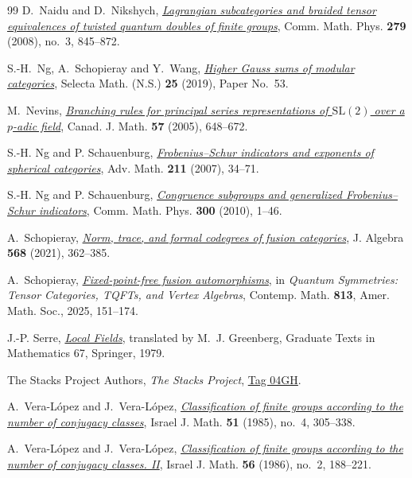 \documentclass[11pt]{amsart}
\numberwithin{equation}{section}
\theoremstyle{definition}
\theoremstyle{plain}
\begin{document}
\begin{thebibliography}{99}
D.~Naidu and D.~Nikshych,
\href{https://doi.org/10.1007/s00220-008-0441-5}{\emph{Lagrangian
subcategories and braided tensor equivalences of twisted quantum doubles
of finite groups}}, Comm. Math. Phys. \textbf{279} (2008), no.~3, 845--872.

S.-H.~Ng, A.~Schopieray and Y.~Wang,
\href{https://doi.org/10.1007/s00029-019-0499-2}{\emph{Higher Gauss sums of modular categories}},
Selecta Math. (N.S.) \textbf{25} (2019), Paper No.~53.

M.~Nevins, \href{https://doi.org/10.4153/CJM-2005-026-1}{\emph{Branching
rules for principal series representations of $\mathrm{SL}(2)$ over a
$p$-adic field}}, Canad. J. Math. \textbf{57} (2005), 648--672.

S.-H. Ng and P. Schauenburg, \href{https://doi.org/10.1016/j.aim.2006.07.017}{\emph{Frobenius--Schur indicators and exponents of spherical categories}}, Adv. Math. \textbf{211} (2007), 34--71.

S.-H. Ng and P. Schauenburg, \href{https://doi.org/10.1007/s00220-010-1096-6}{\emph{Congruence subgroups and generalized Frobenius--Schur indicators}}, Comm. Math. Phys. \textbf{300} (2010), 1--46.

A.~Schopieray, \href{https://doi.org/10.1016/j.jalgebra.2020.10.014}
{\emph{Norm, trace, and formal codegrees of fusion categories}},
J. Algebra \textbf{568} (2021), 362--385.

A.~Schopieray,
\href{https://doi.org/10.1090/conm/813/16287}{\emph{Fixed-point-free fusion automorphisms}},
in \emph{Quantum Symmetries: Tensor Categories, TQFTs, and Vertex Algebras},
Contemp. Math. \textbf{813}, Amer. Math. Soc., 2025, 151--174.

J.-P. Serre, \href{https://doi.org/10.1007/978-1-4757-5673-9}{\emph{Local Fields}}, translated by M.~J. Greenberg,
Graduate Texts in Mathematics 67, Springer, 1979.

The Stacks Project Authors, \emph{The Stacks Project},
\href{https://stacks.math.columbia.edu/tag/04GH}{Tag 04GH}.

A.~Vera-L\'opez and J.~Vera-L\'opez,
\href{https://doi.org/10.1007/BF02764723}{\emph{Classification of finite groups according to the number of conjugacy classes}},
Israel J. Math. \textbf{51} (1985), no.~4, 305--338.

A.~Vera-L\'opez and J.~Vera-L\'opez,
\href{https://doi.org/10.1007/BF02766124}{\emph{Classification of finite groups according to the number of conjugacy classes. II}},
Israel J. Math. \textbf{56} (1986), no.~2, 188--221.


\end{thebibliography}
\end{document}
